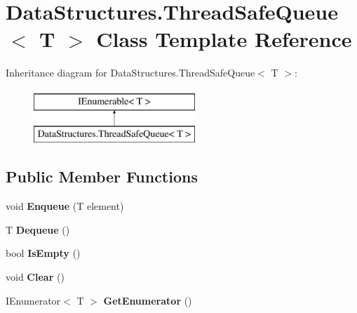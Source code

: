 \hypertarget{class_data_structures_1_1_thread_safe_queue}{}\section{Data\+Structures.\+Thread\+Safe\+Queue$<$ T $>$ Class Template Reference}
\label{class_data_structures_1_1_thread_safe_queue}
Inheritance diagram for Data\+Structures.\+Thread\+Safe\+Queue$<$ T $>$\+:\begin{figure}[H]
\begin{center}
\leavevmode
\includegraphics[height=2.000000cm]{class_data_structures_1_1_thread_safe_queue}
\end{center}
\end{figure}
\subsection*{Public Member Functions}
\begin{DoxyCompactItemize}
\item 
\mbox{\label{class_data_structures_1_1_thread_safe_queue_a57eb48417bd3dbf530d1497836d8d41c}} 
void {\bfseries Enqueue} (T element)
\item 
\mbox{\label{class_data_structures_1_1_thread_safe_queue_add3e3c658a7ce2fc165f257a7e9a36fb}} 
T {\bfseries Dequeue} ()
\item 
\mbox{\label{class_data_structures_1_1_thread_safe_queue_a86d845c86dc2bb0aeed5ed76409dbe36}} 
bool {\bfseries Is\+Empty} ()
\item 
\mbox{\label{class_data_structures_1_1_thread_safe_queue_a201ea8199e7fad098a862a26c19f4358}} 
void {\bfseries Clear} ()
\item 
\mbox{\label{class_data_structures_1_1_thread_safe_queue_ad81782d74263c1758cab54c148800c48}} 
I\+Enumerator$<$ T $>$ {\bfseries Get\+Enumerator} ()
\end{DoxyCompactItemize}
